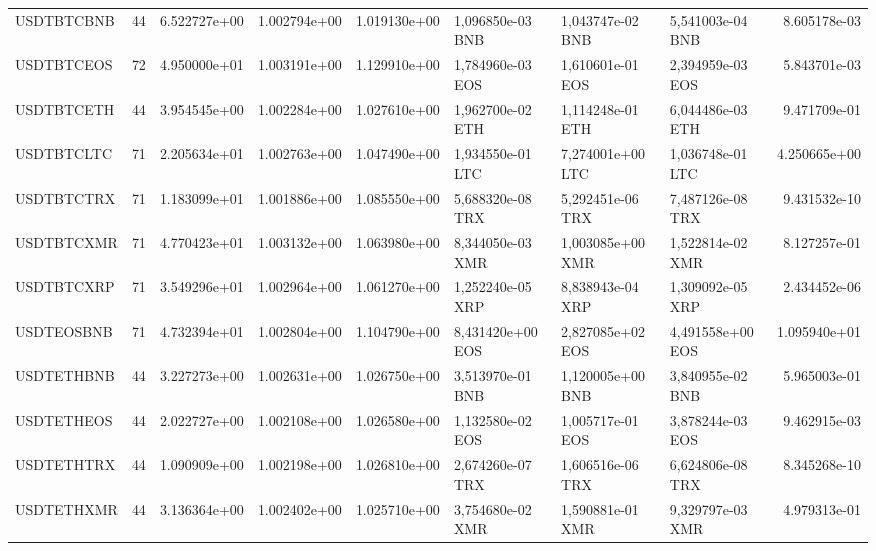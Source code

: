 \begin{tabular}{lrrrrlllr}
 USDTBTCBNB &    44 &   6.522727e+00 &   1.002794e+00 &    1.019130e+00 &  1,096850e-03 BNB &   1,043747e-02 BNB &           5,541003e-04 BNB &                      8.605178e-03 \\
 USDTBTCEOS &    72 &   4.950000e+01 &   1.003191e+00 &    1.129910e+00 &  1,784960e-03 EOS &   1,610601e-01 EOS &           2,394959e-03 EOS &                      5.843701e-03 \\
 USDTBTCETH &    44 &   3.954545e+00 &   1.002284e+00 &    1.027610e+00 &  1,962700e-02 ETH &   1,114248e-01 ETH &           6,044486e-03 ETH &                      9.471709e-01 \\
 USDTBTCLTC &    71 &   2.205634e+01 &   1.002763e+00 &    1.047490e+00 &  1,934550e-01 LTC &   7,274001e+00 LTC &           1,036748e-01 LTC &                      4.250665e+00 \\
 USDTBTCTRX &    71 &   1.183099e+01 &   1.001886e+00 &    1.085550e+00 &  5,688320e-08 TRX &   5,292451e-06 TRX &           7,487126e-08 TRX &                      9.431532e-10 \\
 USDTBTCXMR &    71 &   4.770423e+01 &   1.003132e+00 &    1.063980e+00 &  8,344050e-03 XMR &   1,003085e+00 XMR &           1,522814e-02 XMR &                      8.127257e-01 \\
 USDTBTCXRP &    71 &   3.549296e+01 &   1.002964e+00 &    1.061270e+00 &  1,252240e-05 XRP &   8,838943e-04 XRP &           1,309092e-05 XRP &                      2.434452e-06 \\
 USDTEOSBNB &    71 &   4.732394e+01 &   1.002804e+00 &    1.104790e+00 &  8,431420e+00 EOS &   2,827085e+02 EOS &           4,491558e+00 EOS &                      1.095940e+01 \\
 USDTETHBNB &    44 &   3.227273e+00 &   1.002631e+00 &    1.026750e+00 &  3,513970e-01 BNB &   1,120005e+00 BNB &           3,840955e-02 BNB &                      5.965003e-01 \\
 USDTETHEOS &    44 &   2.022727e+00 &   1.002108e+00 &    1.026580e+00 &  1,132580e-02 EOS &   1,005717e-01 EOS &           3,878244e-03 EOS &                      9.462915e-03 \\
 USDTETHTRX &    44 &   1.090909e+00 &   1.002198e+00 &    1.026810e+00 &  2,674260e-07 TRX &   1,606516e-06 TRX &           6,624806e-08 TRX &                      8.345268e-10 \\
 USDTETHXMR &    44 &   3.136364e+00 &   1.002402e+00 &    1.025710e+00 &  3,754680e-02 XMR &   1,590881e-01 XMR &           9,329797e-03 XMR &                      4.979313e-01 \\

\end{tabular}
